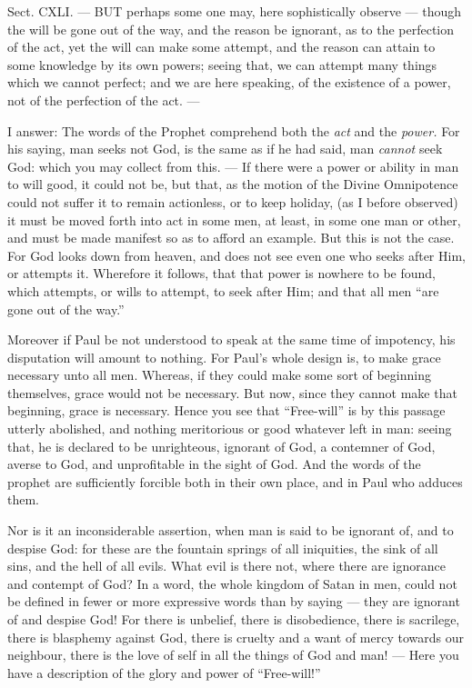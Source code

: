 
Sect. CXLI. — BUT perhaps some one may, here sophistically observe — though the will be gone out of the way, and the reason be ignorant, as to the perfection of the act, yet the will can make some attempt, and the reason can attain to some knowledge by its own powers; seeing that, we can attempt many things which we cannot perfect; and we are here speaking, of the existence of a power, not of the perfection of the act. —

I answer: The words of the Prophet comprehend both the \emph{act }and the \emph{power. }For his saying, man seeks not God, is the same as if he had said, man \emph{cannot }seek God: which you may collect from this. — If there were a power or ability in man to will good, it could not be, but that, as the motion of the Divine Omnipotence could not suffer it to remain actionless, or to keep holiday, (as I before observed) it must be moved forth into act in some men, at least, in some one man or other, and must be made manifest so as to afford an example. But this is not the case. For God looks down from heaven, and does not see even one who seeks after Him, or attempts it. Wherefore it follows, that that power is nowhere to be found, which attempts, or wills to attempt, to seek after Him; and that all men “are gone out of the way.”

Moreover if Paul be not understood to speak at the same time of impotency, his disputation will amount to nothing. For Paul’s whole design is, to make grace necessary unto all men. Whereas, if they could make some sort of beginning themselves, grace would not be necessary. But now, since they cannot make that beginning, grace is necessary. Hence you see that “Free-will” is by this passage utterly abolished, and nothing meritorious or good whatever left in man: seeing that, he is declared to be unrighteous, ignorant of God, a contemner of God, averse to God, and unprofitable in the sight of God. And the words of the prophet are sufficiently forcible both in their own place, and in Paul who adduces them.

Nor is it an inconsiderable assertion, when man is said to be ignorant of, and to despise God: for these are the fountain springs of all iniquities, the sink of all sins, and the hell of all evils. What evil is there not, where there are ignorance and contempt of God? In a word, the whole kingdom of Satan in men, could not be defined in fewer or more expressive words than by saying — they are ignorant of and despise God! For there is unbelief, there is disobedience, there is sacrilege, there is blasphemy against God, there is cruelty and a want of mercy towards our neighbour, there is the love of self in all the things of God and man! — Here you have a description of the glory and power of “Free-will!”

